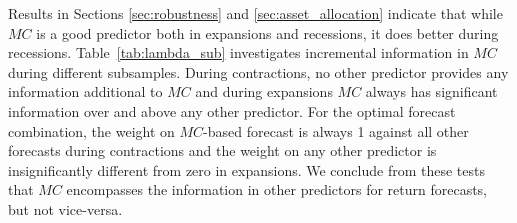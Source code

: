 Results in Sections \ref{sec:robustness} and
\ref{sec:asset_allocation} indicate that while $MC$ is a good
predictor both in expansions and recessions, it does better during
recessions. Table~\ref{tab:lambda_sub} investigates incremental
information in $MC$ during different subsamples. During contractions, no other predictor provides any information additional to $MC$ and during expansions $MC$ always has significant information over and above any other predictor.
For the optimal forecast combination, the weight on $MC$-based forecast is always
1 against all other forecasts during contractions and
the weight on any other predictor is insignificantly different from zero in expansions. We conclude from these tests that $MC$ encompasses the information in other predictors for return forecasts, but not vice-versa.